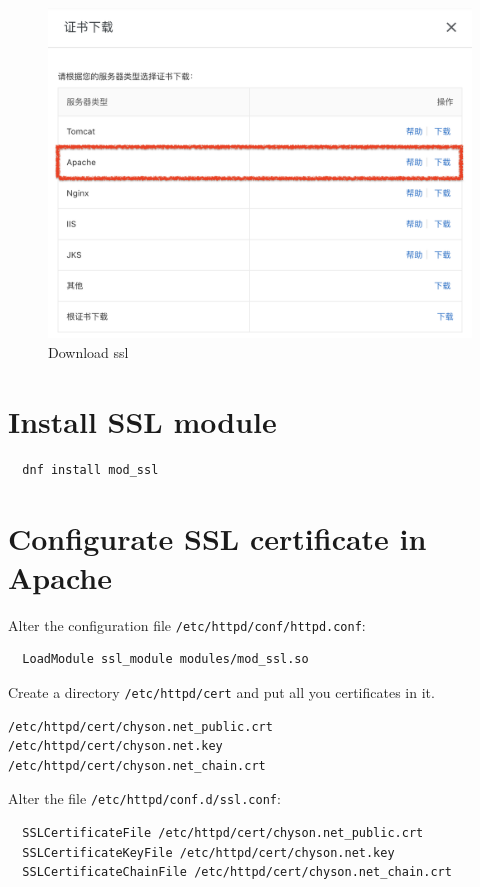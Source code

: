 \begin{figure}[!ht]
  \centering
  \includegraphics[width=\textwidth]{download-ssl2.png}
  \caption{Download ssl}
  \label{fig:download-ssl2}
\end{figure}

\section{Install SSL module}
\lstset{language=Sh}
\begin{lstlisting}
  dnf install mod_ssl
\end{lstlisting}

\section{Configurate SSL certificate in Apache}

Alter the configuration file \verb|/etc/httpd/conf/httpd.conf|:

\begin{lstlisting}
  LoadModule ssl_module modules/mod_ssl.so  
\end{lstlisting}

Create a directory \verb|/etc/httpd/cert| and put all you certificates in it.
\begin{verbatim}
/etc/httpd/cert/chyson.net_public.crt
/etc/httpd/cert/chyson.net.key
/etc/httpd/cert/chyson.net_chain.crt
\end{verbatim}

Alter the file \verb|/etc/httpd/conf.d/ssl.conf|:
\begin{lstlisting}
  SSLCertificateFile /etc/httpd/cert/chyson.net_public.crt
  SSLCertificateKeyFile /etc/httpd/cert/chyson.net.key
  SSLCertificateChainFile /etc/httpd/cert/chyson.net_chain.crt
\end{lstlisting}




